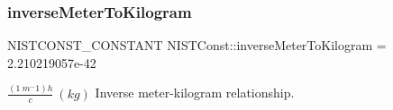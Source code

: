 \subsubsection{\texorpdfstring{inverse\+Meter\+To\+Kilogram}{inverseMeterToKilogram}}
{\footnotesize\ttfamily N\+I\+S\+T\+C\+O\+N\+S\+T\+\_\+\+C\+O\+N\+S\+T\+A\+NT N\+I\+S\+T\+Const\+::inverse\+Meter\+To\+Kilogram = 2.\+210219057e-\/42}

$\frac{(1\ m^-1)h}{c} \ (kg)$ Inverse meter-\/kilogram relationship. 